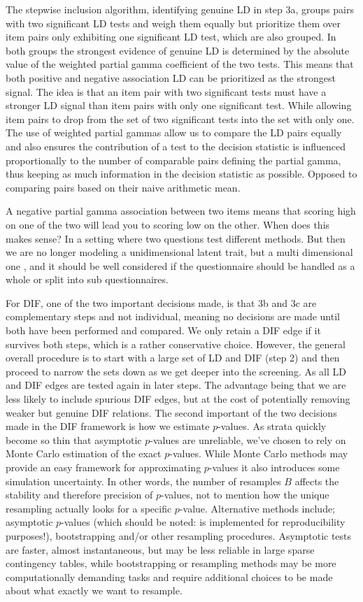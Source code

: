 \documentclass[a4project,12pt]{article}
\theoremstyle{examplestyle}
\theoremstyle{defstyle}
\theoremstyle{thmstyle}
\begin{document}
The stepwise inclusion algorithm, identifying genuine LD in step 3a, groups pairs with two significant LD tests and weigh them equally but prioritize them over item pairs only exhibiting one significant LD test, which are also grouped. In both groups the strongest evidence of genuine LD is determined by the absolute value of the weighted partial gamma coefficient of the two tests. This means that both positive and negative association LD can be prioritized as the strongest signal. The idea is that an item pair with two significant tests must have a stronger LD signal than item pairs with only one significant test. While allowing item pairs to drop from the set of two significant tests into the set with only one. The use of weighted partial gammas allow us to compare the LD pairs equally and also ensures the contribution of a test to the decision statistic is influenced proportionally to the number of comparable pairs defining the partial gamma, thus keeping as much information in the decision statistic as possible. Opposed to comparing pairs based on their naive arithmetic mean. 

A negative partial gamma association between two items means that scoring high on one of the two will lead you to scoring low on the other. When does this makes sense? In a setting where two questions test different methods. But then we are no longer modeling a unidimensional latent trait, but a multi dimensional one \cite{Kreiner2004_neg_partial_gam_discussion}, and it should be well considered if the questionnaire should be handled as a whole or split into sub questionnaires.  


For DIF, one of the two important decisions made, is that 3b and 3c are complementary steps and not individual, meaning no decisions are made until both have been performed and compared. We only retain a DIF edge if it survives both steps, which is a rather conservative choice. However, the general overall procedure is to start with a large set of LD and DIF (step 2) and then proceed to narrow the sets down as we get deeper into the screening. As all LD and DIF edges are tested again in later steps. The advantage being that we are less likely to include spurious DIF edges, but at the cost of potentially removing weaker but genuine DIF relations. The second important of the two decisions made in the DIF framework is how we estimate $p$-values. As strata quickly become so thin that asymptotic $p$-values are unreliable, we've chosen to rely on Monte Carlo estimation of the exact $p$-values. While Monte Carlo methods may provide an easy framework for approximating $p$-values it also introduces some simulation uncertainty. In other words, the number of resamples $B$ affects the stability and therefore precision of $p$-values, not to mention how the unique resampling actually looks for a specific $p$-value. Alternative methods include; asymptotic $p$-values (which should be noted: is implemented for reproducibility purposes!), bootstrapping and/or other resampling procedures. Asymptotic tests are faster, almost instantaneous, but may be less reliable in large sparse contingency tables, while bootstrapping or resampling methods may be more computationally demanding tasks and require additional choices to be made about what exactly we want to resample. 
\end{document}
